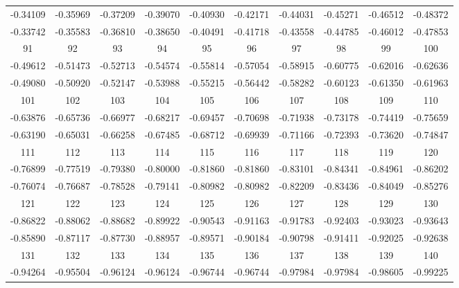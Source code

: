 \documentclass[withoutpreface,bwprint]{cumcmthesis} %
\begin{document}
\begin{center}
\begin{longtable}{cccccccccc}
        \hline
        -0.34109 & -0.35969 & -0.37209 & -0.39070 & -0.40930 & -0.42171 & -0.44031 & -0.45271 & -0.46512 & -0.48372 \\
        -0.33742 & -0.35583 & -0.36810 & -0.38650 & -0.40491 & -0.41718 & -0.43558 & -0.44785 & -0.46012 & -0.47853 \\
        \hline
        91       & 92       & 93       & 94       & 95       & 96       & 97       & 98       & 99       & 100      \\
        \hline
        -0.49612 & -0.51473 & -0.52713 & -0.54574 & -0.55814 & -0.57054 & -0.58915 & -0.60775 & -0.62016 & -0.62636 \\
        -0.49080 & -0.50920 & -0.52147 & -0.53988 & -0.55215 & -0.56442 & -0.58282 & -0.60123 & -0.61350 & -0.61963 \\
        \hline
        101      & 102      & 103      & 104      & 105      & 106      & 107      & 108      & 109      & 110      \\
        \hline
        -0.63876 & -0.65736 & -0.66977 & -0.68217 & -0.69457 & -0.70698 & -0.71938 & -0.73178 & -0.74419 & -0.75659 \\
        -0.63190 & -0.65031 & -0.66258 & -0.67485 & -0.68712 & -0.69939 & -0.71166 & -0.72393 & -0.73620 & -0.74847 \\
        \hline
        111      & 112      & 113      & 114      & 115      & 116      & 117      & 118      & 119      & 120      \\
        \hline
        -0.76899 & -0.77519 & -0.79380 & -0.80000 & -0.81860 & -0.81860 & -0.83101 & -0.84341 & -0.84961 & -0.86202 \\
        -0.76074 & -0.76687 & -0.78528 & -0.79141 & -0.80982 & -0.80982 & -0.82209 & -0.83436 & -0.84049 & -0.85276 \\
        \hline
        121      & 122      & 123      & 124      & 125      & 126      & 127      & 128      & 129      & 130      \\
        \hline
        -0.86822 & -0.88062 & -0.88682 & -0.89922 & -0.90543 & -0.91163 & -0.91783 & -0.92403 & -0.93023 & -0.93643 \\
        -0.85890 & -0.87117 & -0.87730 & -0.88957 & -0.89571 & -0.90184 & -0.90798 & -0.91411 & -0.92025 & -0.92638 \\
        \hline
        131      & 132      & 133      & 134      & 135      & 136      & 137      & 138      & 139      & 140      \\
        \hline
        -0.94264 & -0.95504 & -0.96124 & -0.96124 & -0.96744 & -0.96744 & -0.97984 & -0.97984 & -0.98605 & -0.99225 \\

\end{longtable}
\end{center}
\end{document}
